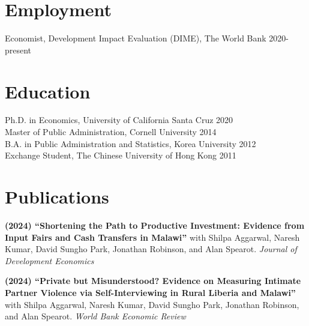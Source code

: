 \documentclass[letterpaper, margin, 10pt]{res} %
\begin{document}
\begin{resume}


 




%


\section{\sc \textbf{Employment}}
Economist, Development Impact Evaluation (DIME), The World Bank \hfill{2020-present}

\section{\sc \textbf{Education}}
{Ph.D. in Economics, University of California Santa Cruz} \hfill 2020\\
{Master of Public Administration, Cornell University} \hfill 2014\\
{B.A. in Public Administration and Statistics, Korea University} \hfill 2012\\
{ Exchange Student, The Chinese University of Hong Kong} \hfill 2011




\normalsize\section{\textbf{Publications}}
\normalsize

{\bf (2024) ``{Shortening the Path to Productive Investment: Evidence from Input Fairs and Cash Transfers in Malawi}''}
with Shilpa Aggarwal, Naresh Kumar, David Sungho Park, Jonathan Robinson, and Alan Spearot. \textit{Journal of Development Economics}

{\bf (2024) ``Private but Misunderstood? Evidence on Measuring Intimate Partner Violence via Self-Interviewing in Rural Liberia and Malawi''}
with Shilpa Aggarwal, Naresh Kumar, David Sungho Park, Jonathan Robinson, and Alan Spearot. \textit{World Bank Economic Review}



\end{resume}
\end{document}
